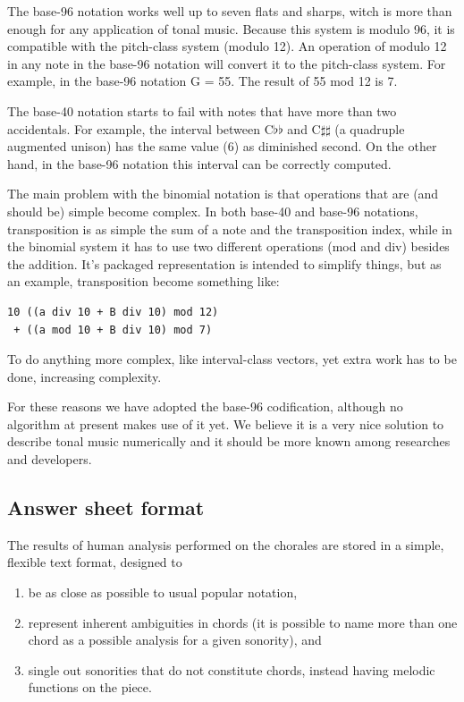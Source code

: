 \documentclass{article}
\begin{document}
The base-96 notation works well up to seven flats and sharps, witch is
more than enough for any application of tonal music. Because this
system is modulo 96, it is compatible with the pitch-class system
(modulo 12). An operation of modulo 12 in any note in the base-96
notation will convert it to the pitch-class system. For example, in
the base-96 notation G = 55. The result of 55 mod 12 is 7.

The base-40 notation starts to fail with notes that have more than two
accidentals. For example, the interval between C$\flat\flat$ and
C$\sharp\sharp$ (a quadruple augmented unison) has the same value (6)
as diminished second. On the other hand, in the base-96 notation this
interval can be correctly computed.

The main problem with the binomial notation is that operations that
are (and should be) simple become complex. In both base-40 and base-96
notations, transposition is as simple the sum of a note and the
transposition index, while in the binomial system it has to use two
different operations (mod and div) besides the addition. It's packaged
representation is intended to simplify things, but as an example,
transposition become something like:

\begin{verbatim}
10 ((a div 10 + B div 10) mod 12)
 + ((a mod 10 + B div 10) mod 7)
\end{verbatim}

To do anything more complex, like interval-class vectors, yet extra
work has to be done, increasing complexity.

For these reasons we have adopted the base-96 codification, although no
algorithm at present makes use of it yet. We believe it is a very nice
solution to describe tonal music numerically and it should be more
known among researches and developers.

\subsection{Answer sheet format}
\label{sec:formato-dos-acordes}

The results of human analysis performed on the chorales are stored in
a simple, flexible text format, designed to

\begin{enumerate}
\item be as close as possible to usual popular notation,
\item represent inherent ambiguities in chords (it is possible to name
  more than one chord as a possible analysis for a given sonority),
  and
\item single out sonorities that do not constitute chords, instead
  having melodic functions on the piece.
\end{enumerate}
\end{document}
